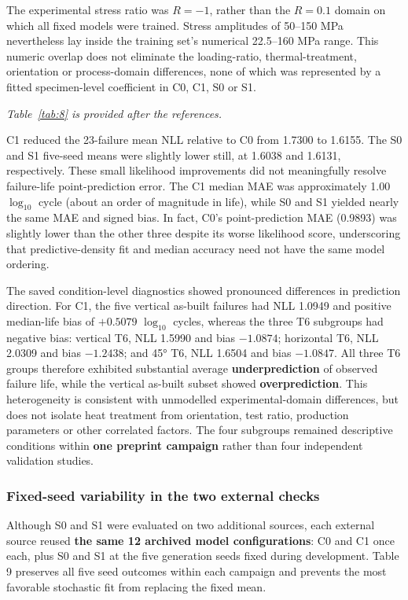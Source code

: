 \documentclass[12pt,a4paper]{article}
\begin{document}
The experimental stress ratio was \(R=-1\), rather than the \(R=0.1\) domain on which all fixed models were trained. Stress amplitudes of 50–150 MPa nevertheless lay inside the training set's numerical 22.5–160 MPa range. This numeric overlap does not eliminate the loading-ratio, thermal-treatment, orientation or process-domain differences, none of which was represented by a fitted specimen-level coefficient in C0, C1, S0 or S1.

\noindent\textit{Table~\ref{tab:8} is provided after the references.}\par

C1 reduced the 23-failure mean NLL relative to C0 from 1.7300 to 1.6155. The S0 and S1 five-seed means were slightly lower still, at 1.6038 and 1.6131, respectively. These small likelihood improvements did not meaningfully resolve failure-life point-prediction error. The C1 median MAE was approximately 1.00 \(\log_{10}\) cycle (about an order of magnitude in life), while S0 and S1 yielded nearly the same MAE and signed bias. In fact, C0's point-prediction MAE (0.9893) was slightly lower than the other three despite its worse likelihood score, underscoring that predictive-density fit and median accuracy need not have the same model ordering.

The saved condition-level diagnostics showed pronounced differences in prediction direction. For C1, the five vertical as-built failures had NLL 1.0949 and positive median-life bias of \(+0.5079\) \(\log_{10}\) cycles, whereas the three T6 subgroups had negative bias: vertical T6, NLL 1.5990 and bias \(-1.0874\); horizontal T6, NLL 2.0309 and bias \(-1.2438\); and 45° T6, NLL 1.6504 and bias \(-1.0847\). All three T6 groups therefore exhibited substantial average \textbf{underprediction} of observed failure life, while the vertical as-built subset showed \textbf{overprediction}. This heterogeneity is consistent with unmodelled experimental-domain differences, but does not isolate heat treatment from orientation, test ratio, production parameters or other correlated factors. The four subgroups remained descriptive conditions within \textbf{one preprint campaign} rather than four independent validation studies.

\subsubsection{Fixed-seed variability in the two external checks}

Although S0 and S1 were evaluated on two additional sources, each external source reused \textbf{the same 12 archived model configurations}: C0 and C1 once each, plus S0 and S1 at the five generation seeds fixed during development. Table 9 preserves all five seed outcomes within each campaign and prevents the most favorable stochastic fit from replacing the fixed mean.
\end{document}

